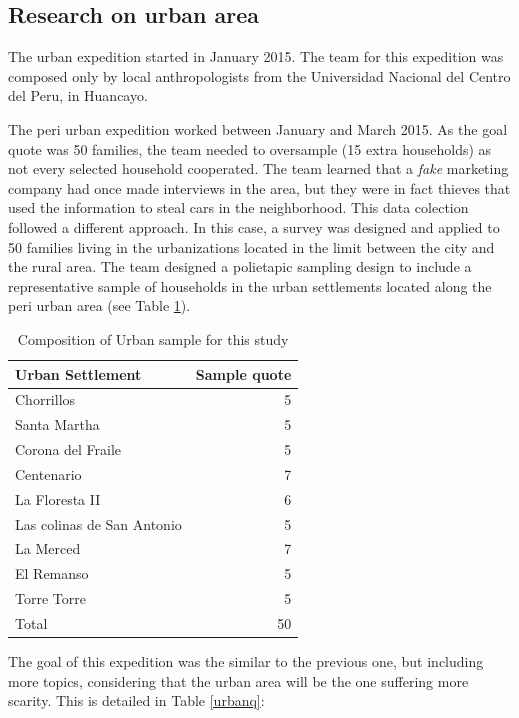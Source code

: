 \documentclass{article}
\begin{document}
\subsection{Research on urban area}

The urban expedition started in January 2015. The team for this expedition was composed only by local anthropologists from the Universidad Nacional del Centro del Peru, in Huancayo. 

The peri urban expedition worked between January and March 2015. As the goal quote was 50 families, the team needed to oversample (15 extra households) as not every selected household cooperated. The team learned that a \emph{fake} marketing company had once made interviews in the area, but they were in fact thieves that used the information to steal cars in the neighborhood. This data colection followed a different approach. In this case, a survey was designed and applied to 50 families living in the urbanizations located in the limit between the city and the rural area. The team designed a polietapic sampling design to include a representative sample of households in the urban settlements located along the peri urban area (see Table \ref{urbansample}).



\begin{table}[ht]
\centering
\caption{Composition of Urban sample for this study}
\begin{tabular}{lr}
 Urban Settlement & Sample quote \\ 
  \hline
Chorrillos &   5 \\ 
  Santa Martha &   5 \\ 
  Corona del Fraile &   5 \\ 
  Centenario &   7 \\ 
  La Floresta II &   6 \\ 
  Las colinas de San Antonio &   5 \\ 
  La Merced &   7 \\ 
  El Remanso &   5 \\ 
  Torre Torre &   5 \\ 
   \hline
Total &  50 \\ 
  \end{tabular}\label{urbansample}
\end{table}


The goal of this expedition was the similar to the previous one, but including more topics, considering that the urban area will be the one suffering more scarity. This is detailed in Table \ref{urbanq}:
\end{document}
